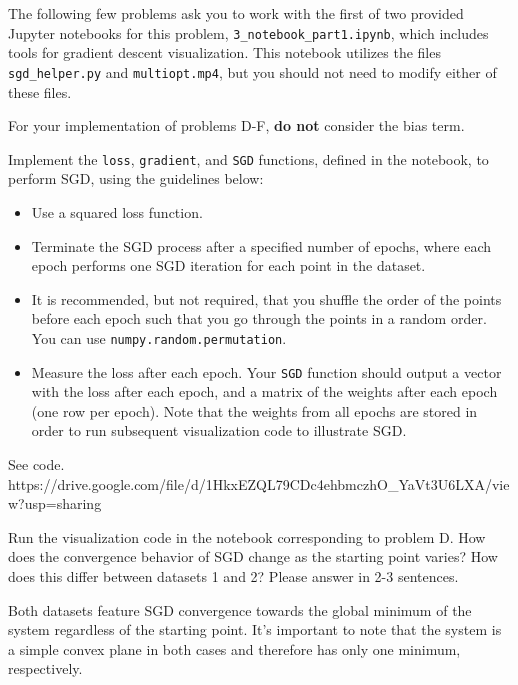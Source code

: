 The following few problems ask you to work with the first of two provided Jupyter notebooks for this problem, \texttt{3_notebook_part1.ipynb}, which includes tools for gradient descent visualization. This notebook utilizes the files \texttt{sgd_helper.py} and \texttt{multiopt.mp4}, but you should not need to modify either of these files. 

For your implementation of problems D-F, \textbf{do not} consider the bias term.

\begin{problem}[6]
  Implement the \texttt{loss}, \texttt{gradient}, and \texttt{SGD} functions, defined in the notebook, to perform SGD, using the guidelines below:

  \begin{itemize}
    \item Use a squared loss function.
    \item Terminate the SGD process after a specified number of epochs, where each epoch performs one SGD iteration for each point in the dataset.
    \item It is recommended, but not required, that you shuffle the order of the points before each epoch such that you go through the points in a random order. You can use \texttt{numpy.random.permutation}.
    \item Measure the loss after each epoch. Your \texttt{SGD} function should output a vector with the loss after each epoch, and a matrix of the weights after each epoch (one row per epoch). Note that the weights from all epochs are stored in order to run subsequent visualization code to illustrate SGD.
  \end{itemize}
\end{problem}
\begin{solution}
See code.\\ %
https://drive.google.com/file/d/1HkxEZQL79CDc4ehbmczhO_YaVt3U6LXA/view?usp=sharing
\end{solution}

\begin{problem}[2]
  Run the visualization code in the notebook corresponding to problem D. How does the convergence behavior of SGD change as the starting point varies? How does this differ between datasets 1 and 2? Please answer in 2-3 sentences.
\end{problem}
\begin{solution}
Both datasets feature SGD convergence towards the global minimum of the system regardless of the starting point. It's important to note that the system is a simple convex plane in both cases and therefore has only one minimum, respectively.
\end{solution}

